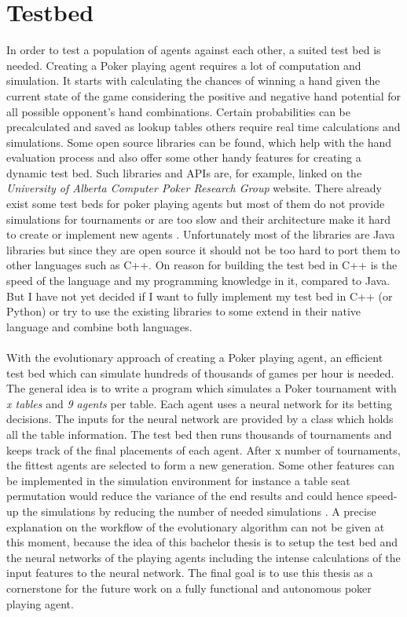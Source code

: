 \chapter{Testbed}
In order to test a population of agents against each other, a suited test bed is needed. Creating a Poker playing agent requires a lot of computation and simulation. It starts with calculating the chances of winning a hand given the current state of the game considering the positive and negative hand potential for all possible opponent's hand combinations. Certain probabilities can be precalculated and saved as lookup tables others require real time calculations and simulations. Some open source libraries can be found, which help with the hand evaluation process and also offer some other handy features for creating a dynamic test bed. Such libraries and APIs are, for example,  linked on the \textit{University of Alberta Computer Poker Research Group} website. There already exist some test beds for poker playing agents but most of them do not provide simulations for tournaments or are too slow and their architecture make it hard to create or implement new agents \cite{agent_sim}. Unfortunately most of the libraries are Java libraries but since they are open source it should not be too hard to port them to other languages such as C++. On reason for building the test bed in C++ is the speed of the language and my programming  knowledge in it, compared to Java. But I have not yet decided if I want to fully implement my test bed in C++ (or Python) or try to use the existing libraries to some extend in their native language and combine both languages.\\\\
With the evolutionary approach of creating a Poker playing agent, an efficient test bed which can simulate hundreds of thousands of games per hour is needed. The general idea is to write a program which simulates a Poker tournament with \textit{x tables} and \textit{9 agents} per table. Each agent uses a neural network for its betting decisions. The inputs for the neural network are provided by a class which holds all the table information. The test bed then runs thousands of tournaments and keeps track of the final placements of each agent. After x number of tournaments, the fittest agents are selected to form a new generation. Some other features can be implemented in the simulation environment for instance a table seat permutation would reduce the variance of the end results and could hence speed-up the simulations by reducing the number of needed simulations \cite{agent_sim}. A precise explanation on the workflow of the evolutionary algorithm can not be given at this moment, because the idea of this bachelor thesis is to setup the test bed and the neural networks of the playing agents including the intense calculations of the input features to the neural network. The final goal is to use this thesis as a cornerstone for the future work on a fully functional and autonomous poker playing agent.
